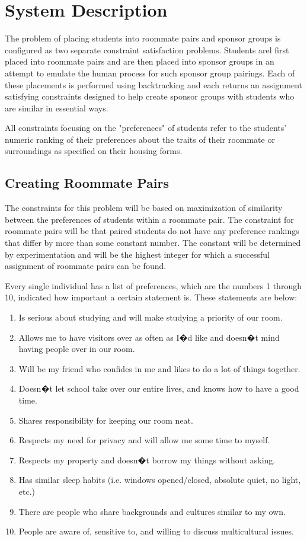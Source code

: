 \documentclass[letterpaper]{article}
\begin{document}
\section{System Description}
The problem of placing students into roommate pairs and sponsor groups is configured as two separate constraint satisfaction problems. Students arel first placed into roommate pairs and are then placed into sponsor groups in an attempt to emulate the human process for such sponsor group pairings. Each of these placements is performed using backtracking and each returns an assignment satisfying constraints designed to help create sponsor groups with students who are similar in essential ways.

All constraints focusing on the "preferences" of students refer to the students'  numeric ranking of their preferences about the traits of their roommate or surroundings as specified on their housing forms.

\subsection{Creating Roommate Pairs}

The constraints for this problem will be based on maximization of similarity between the preferences of students within a roommate pair. The constraint for roommate pairs will be that paired students do not have any preference rankings that differ by more than some constant number. The constant will be determined by experimentation and will be the highest integer for which a successful assignment of roommate pairs can be found.

Every single individual has a list of preferences, which are the numbers 1 through 10, indicated how important a certain statement is. These statements are below: 

\begin{enumerate}
\item Is serious about studying and will make studying a priority of our room.
\item Allows me to have visitors over as often as I�d like and doesn�t mind having people over in our room.
\item Will be my friend who confides in me and likes to do a lot of things together.
\item Doesn�t let school take over our entire lives, and knows how to have a good time.
\item Shares responsibility for keeping our room neat.
\item Respects my need for privacy and will allow me some time to myself.
\item Respects my property and doesn�t borrow my things without asking.
\item Has similar sleep habits (i.e. windows opened/closed, absolute quiet, no light, etc.)
\item There are people who share backgrounds and cultures similar to my own.
\item People are aware of, sensitive to, and willing to discuss multicultural issues.
\end{enumerate}
\end{document}
